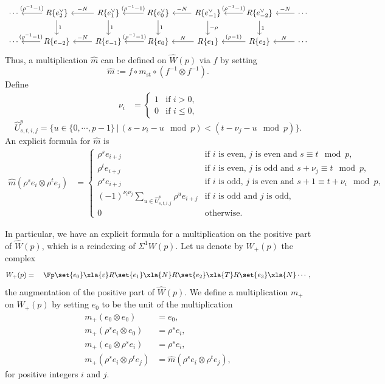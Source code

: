 \[
\begin{tikzcd}%
%
\cdots & 
R\{e_{2}^\vee\} \arrow[l, "(\rho^{-1}-1)" '] \arrow[d, "1"] & 
R\{e_{1}^\vee\} \arrow[l, "-N" '] \arrow[d, "1"] & 
R\{e_0^\vee\} \arrow[l, "(\rho^{-1}-1)" '] \arrow[d, "1"] & 
R\{e_{-1}^\vee\} \arrow[l, "-N" '] \arrow[d, "-\rho"] & 
R\{e_{-2}^\vee\} \arrow[l, "(\rho^{-1}-1)" '] \arrow[d, "1"]&
\cdots \arrow[l, "-N" '] \\
% 
\cdots & 
R\{e_{-2}\} \arrow[l, "(\rho^{-1}-1)" '] & 
R\{e_{-1}\} \arrow[l, "-N" '] & 
R\{e_0\} \arrow[l, "(\rho^{-1}-1)" '] & 
R\{e_{1}\} \arrow[l, "N" '] & 
R\{e_{2}\} \arrow[l, "(\rho-1)" '] &
\cdots \arrow[l, "N" ']
\end{tikzcd}
\]
Thus, a multiplication $\widehat m$ can be defined on $\widehat W(p)$ via $f$ by setting
\[
\widehat m:=f\circ m_{\text{st}}\circ (f^{-1}\otimes f^{-1}).
\]
Define
\begin{align*}
	\nu_i&= \begin{cases}
	1 & \text{if $i>0$,}
	\\
	0 &\text{if $i\leq 0$,}
	\end{cases}
\end{align*}
\[
\widehat U^p_{s,t,i,j}=\{u\in\{0,\cdots,p-1\}\, |\,  (s-\nu_i-u \mod p) < (t-\nu_j-u \mod p)\}.
\]
An explicit formula for $\widehat m$ is 
\begin{align*}
	\widehat m(\rho^s  e_i\otimes \rho^t e_j)&= \begin{cases}
	\rho^s  e_{i+j}& \text{if $i$ is even, $j$ is even and $s\equiv t \mod p$,}
	\\
	\rho^t e_{i+j}& \text{if $i$ is even, $j$ is odd and $s+\nu_j \equiv t \mod p$,}
	\\
	\rho^s e_{i+j}& \text{if $i$ is odd, $j$ is even and $s+1\equiv t+\nu_i \mod p$,}
	\\
	(-1)^{\nu_i\nu_j}\sum_{u\in \widehat U^p_{s,t,i,j}}\rho^u e_{i+j} & \text{if $i$ is odd and $j$ is odd,}
	\\
	0&\text{otherwise.}
	\end{cases}
\end{align*}

In particular, we have an explicit formula for a multiplication on the positive part of $\widehat W(p)$, which is a reindexing of $\Sigma^1 W(p)$. Let us denote by $W_+(p)$ the complex
\[
W_+(p) =\quad  \Fp\set{e_0} \xla{\varepsilon} R\set{e_1} \xla{N} R\set{e_2} \xla{T} R\set{e_3} \xla{N} \cdots,
\]
the augmentation of the positive part of $\widehat W(p)$. We define a multiplication $m_+$ on $W_+(p)$ by setting $e_0$ to be the unit of the multiplication %
\begin{align*} 
m_+(e_0\otimes e_0)&= e_0, \\ 
m_+(\rho^s e_i\otimes e_0)&= \rho^s e_i, \\ 
m_+(e_0\otimes \rho^s e_i)&= \rho^s e_i, \\ 
m_+(\rho^s e_i\otimes \rho^t e_j)&= \widehat m(\rho^s e_i\otimes \rho^t e_j),
\end{align*}
for positive integers $i$ and $j$.

